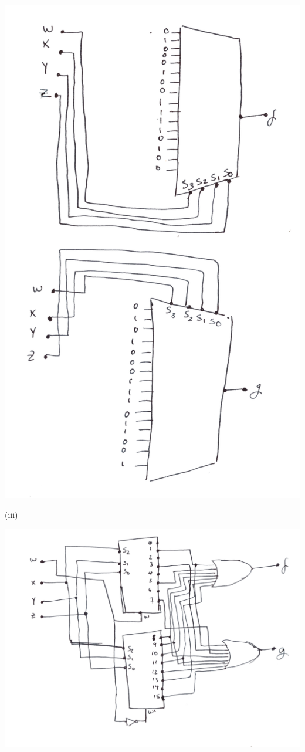 \documentclass{article}
\begin{document}
    \begin{center}
        \includegraphics[width=\linewidth]{HW3_q7.2.png}
    \end{center}

    \quad\quad (iii)

    \begin{center}
        \includegraphics[width=\linewidth]{HW3_q7.3.png}
    \end{center}
\end{document}
